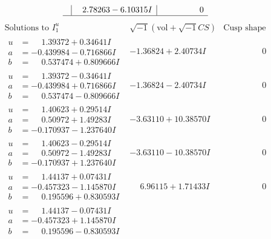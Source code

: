 \documentclass[1p]{elsarticle_modified}
\theoremstyle{definition}
\newcommand{\I}{\sqrt{-1}}
\begin{document}
$$\begin{array}{c|c|c}
 & \phantom{-}2.78263 - 6.10315 I & \phantom{-0.000000 } 0\\
 \hline 
 \end{array}$$\newpage$$\begin{array}{c|c|c}  
\text{Solutions to }I^u_{1}& \I (\text{vol} + \sqrt{-1}CS) & \text{Cusp shape}\\
 \hline 
\begin{aligned}
u &= \phantom{-}1.39372 + 0.34641 I \\
a &= -0.439984 - 0.716866 I \\
b &= \phantom{-}0.537474 + 0.809666 I\end{aligned}
 & -1.36824 + 2.40734 I & \phantom{-0.000000 } 0 \\ \hline\begin{aligned}
u &= \phantom{-}1.39372 - 0.34641 I \\
a &= -0.439984 + 0.716866 I \\
b &= \phantom{-}0.537474 - 0.809666 I\end{aligned}
 & -1.36824 - 2.40734 I & \phantom{-0.000000 } 0 \\ \hline\begin{aligned}
u &= \phantom{-}1.40623 + 0.29514 I \\
a &= \phantom{-}0.50972 + 1.49283 I \\
b &= -0.170937 - 1.237640 I\end{aligned}
 & -3.63110 + 10.38570 I & \phantom{-0.000000 } 0 \\ \hline\begin{aligned}
u &= \phantom{-}1.40623 - 0.29514 I \\
a &= \phantom{-}0.50972 - 1.49283 I \\
b &= -0.170937 + 1.237640 I\end{aligned}
 & -3.63110 - 10.38570 I & \phantom{-0.000000 } 0 \\ \hline\begin{aligned}
u &= \phantom{-}1.44137 + 0.07431 I \\
a &= -0.457323 - 1.145870 I \\
b &= \phantom{-}0.195596 + 0.830593 I\end{aligned}
 & \phantom{-}6.96115 + 1.71433 I & \phantom{-0.000000 } 0 \\ \hline\begin{aligned}
u &= \phantom{-}1.44137 - 0.07431 I \\
a &= -0.457323 + 1.145870 I \\
b &= \phantom{-}0.195596 - 0.830593 I\end{aligned}

\end{array}$$
\end{document}
